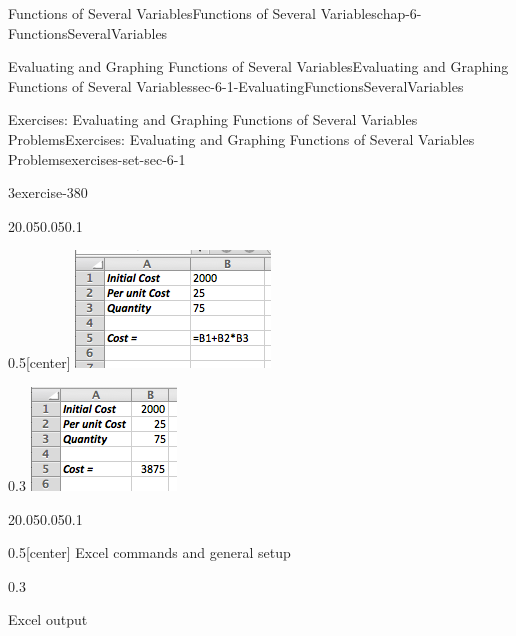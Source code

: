 \documentclass[oneside,10pt,]{book}
\numberwithin{equation}{section}
\begin{document}
\begin{chapterptx}{Functions of Several Variables}{}{Functions of Several Variables}{}{}{chap-6-FunctionsSeveralVariables}
\begin{sectionptx}{Evaluating and Graphing Functions of Several Variables}{}{Evaluating and Graphing Functions of Several Variables}{}{}{sec-6-1-EvaluatingFunctionsSeveralVariables}
\begin{exercises-subsection-numberless}{Exercises: Evaluating and Graphing Functions of Several Variables Problems}{}{Exercises: Evaluating and Graphing Functions of Several Variables Problems}{}{}{exercises-set-sec-6-1}
\begin{exercisegroup}
\begin{divisionexerciseeg}{3}{}{}{exercise-380}
\begin{sidebyside}{2}{0.05}{0.05}{0.1}
\begin{sbspanel}{0.5}[center]
\includegraphics[width=1\linewidth]{images/sec6-1-sol3a.png}
\end{sbspanel}%
\begin{sbspanel}{0.3}%
\includegraphics[width=1\linewidth]{images/sec6-1-sol3b.png}
\end{sbspanel}%
\end{sidebyside}%
\begin{sidebyside}{2}{0.05}{0.05}{0.1}%
\begin{sbspanel}{0.5}[center]%
\hypertarget{p-2155}{}%
Excel commands  and general setup%
\end{sbspanel}%
\begin{sbspanel}{0.3}%
\par
\hypertarget{p-2156}{}%
Excel output%
\end{sbspanel}%
\end{sidebyside}%
\end{divisionexerciseeg}%

\end{exercisegroup}
\end{exercises-subsection-numberless}
\end{sectionptx}
\end{chapterptx}
\end{document}
